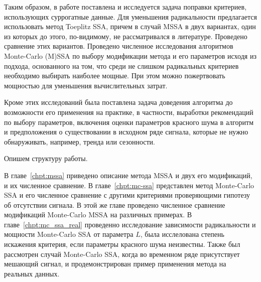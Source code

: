 \documentclass[specialist,
substylefile = spbu_report.rtx,
subf,href,colorlinks=true, 12pt]{disser}
\theoremstyle{definition}
\begin{document}
 Таким образом, в работе поставлена и исследуется задача поправки критериев, использующих суррогатные данные. Для уменьшения радикальности предлагается использовать метод Toeplitz SSA, причем в случай MSSA в двух вариантах, один из которых до этого, по-видимому, не рассматривался в литературе.
 Проведено сравнение этих вариантов.
 Проведено численное исследования алгоритмов Monte-Carlo (M)SSA по выбору модификации метода и его параметров исходя из подхода, основанного на том, что среди не слишком радикальных критериев необходимо выбирать наиболее мощные. При этом можно пожертвовать мощностью для уменьшения вычислительных затрат. 
 
 Кроме этих исследований была поставлена задача доведения алгоритма до возможности его применения на практике, в частности, выработки рекомендаций по выбору параметров, включения оценки параметров красного шума в алгоритм и предположения о существовании в исходном ряде сигнала, которые не нужно обнаруживать, например, тренда или сезонности.
%

Опишем структуру работы.

В главе~\ref{chpt:mssa} приведено описание метода MSSA и двух его модификаций, и их численное сравнение. В главе~\ref{chpt:mc-ssa} представлен метод Monte-Carlo SSA и его численное сравнение с другими критериями проверяющими гипотезу об отсутствии сигнала. В этой же главе проведено численное сравнение модификаций Monte-Carlo MSSA на различных примерах. В главе~\ref{chpt:mc_ssa_real} проведенно исследование зависимости радикальности и мощности Monte-Carlo SSA от параметра $L$, была исслелована степень искажения критерия, если параметры красного шума неизвестны. Также был рассмотрен случай Monte-Carlo SSA, когда во временном ряде присутствует мешающий сигнал, и продемонстрирован пример применения метода на реальных данных.
\end{document}
